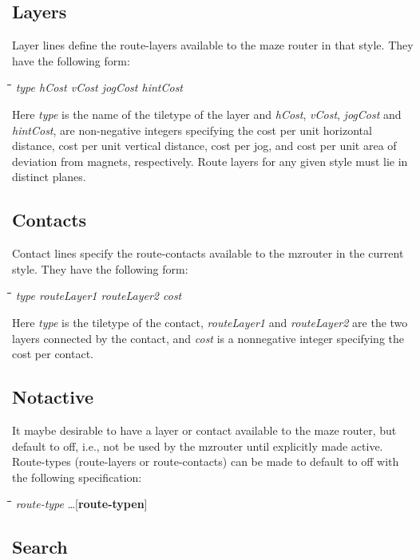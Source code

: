 \documentclass[letterpaper,twoside,12pt]{article}
\def\hinch{\hspace*{0.5in}}
\def\starti{\begin{center}\begin{tabbing}\hinch\=\hinch\=\hinch\=\hinch\=\kill}
\def\endi{\end{tabbing}\end{center}}
\def\ii{\>\>\>}
\begin{document}
\subsection{Layers}

Layer lines
define the route-layers available to the maze router in that style.  They
have the following form:

\starti
   \ii {\bfseries layer} {\itshape type hCost vCost jogCost hintCost}
\endi

Here {\itshape type} is the name of the tiletype of the layer and {\itshape hCost},
{\itshape vCost}, {\itshape jogCost} and {\itshape hintCost}, are non-negative integers
specifying the cost per unit horizontal distance, 
cost per unit vertical distance, cost per jog, and 
cost per unit area of deviation from magnets, respectively.  Route layers
for any given style must lie in distinct planes.

\subsection{Contacts}

Contact lines specify
the route-contacts available to the mzrouter in the current
style.   They have the following form:

\starti
   \ii {\bfseries contact} {\itshape type routeLayer1 routeLayer2 cost}
\endi

Here {\itshape type} is the tiletype of the contact, {\itshape routeLayer1} and
{\itshape routeLayer2} are the two layers connected by the contact, and {\itshape cost}
is a nonnegative integer specifying the cost per contact.

\subsection{Notactive}

It maybe desirable to have a layer or contact available to the maze router, 
but default to off, i.e., not be used by the mzrouter until explicitly
made active.  Route-types (route-layers or route-contacts) can be made to 
default to off with the following specification:

\starti
   \ii {\bfseries notactive} {\itshape route-type} \dots [{\bfseries route-typen}]
\endi

\subsection{Search}
\end{document}
